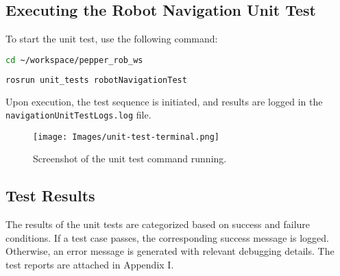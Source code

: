 \documentclass{CSSRforAfrica}
\begin{document}
\subsection{Executing the Robot Navigation Unit Test}
To start the unit test, use the following command:

\begin{lstlisting}[style=withoutNumbering, language=bash]
cd ~/workspace/pepper_rob_ws
\end{lstlisting}
\begin{lstlisting}[style=withoutNumbering, language=bash]
rosrun unit_tests robotNavigationTest
\end{lstlisting}
Upon execution, the test sequence is initiated, and results are logged in the \texttt{navigationUnitTestLogs.log} file.
\begin{figure}[H]
    \centering
    \texttt{[image: Images/unit-test-terminal.png]}
    \caption{Screenshot of the unit test command running.}
    \label{fig:unit_test_terminal}
\end{figure}

\subsection{Test Results}
The results of the unit tests are categorized based on success and failure conditions. If a test case passes, the corresponding success message is logged. Otherwise, an error message is generated with relevant debugging details. The test reports are attached in Appendix I.

\newpage
\appendix
\end{document}
